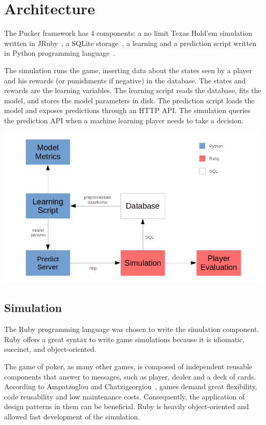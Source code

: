 \newpage

\chapter{Architecture}
\label{chap:architecture}

The Pucker framework has 4 components: a no limit Texas Hold’em simulation written in JRuby~\cite{jruby.org}, a SQLite storage~\cite{sqlite.org}, a learning and a prediction script written in Python programming language~\cite{python.org}.

The simulation runs the game, inserting data about the states seen by a player and his rewards (or punishments if negative) in the database. The states and rewards are the learning variables. The learning script reads the database, fits the model, and stores the model parameters in disk. The prediction script loads the model and exposes predictions through an HTTP API. The simulation queries the prediction API when a machine learning player needs to take a decision.

\vspace{1cm}
\includegraphics[scale=2]{architecture}

\section{Simulation}
\label{sec:simulation}

The Ruby programming language was chosen to write the simulation component. Ruby offers a great syntax to write game simulations because it is idiomatic, succinct, and object-oriented.

The game of poker, as many other games, is composed of independent reusable components that answer to messages, such as player, dealer and a deck of cards. According to Ampatzoglou and Chatzigeorgiou~\cite{Ampatzoglou2007}, games demand great flexibility, code reusability and low maintenance costs. Consequently, the application of design patterns in them can be beneficial. Ruby is heavily object-oriented and allowed fast development of the simulation.

